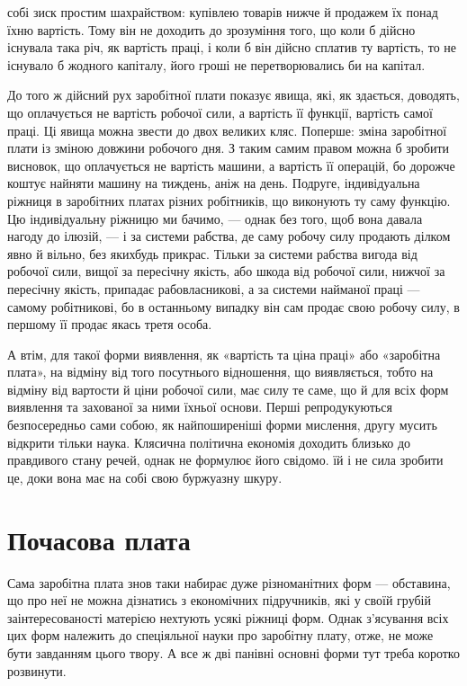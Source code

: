 \parcont{}  %
собі зиск простим шахрайством: купівлею товарів нижче й продажем
їх понад їхню вартість. Тому він не доходить до зрозуміння
того, що коли б дійсно існувала така річ, як вартість праці, і
коли б він дійсно сплатив ту вартість, то не існувало б жодного
капіталу, його гроші не перетворювались би на капітал.

До того ж дійсний рух заробітної плати показує явища, які,
як здається, доводять, що оплачується не вартість робочої
сили, а вартість її функції, вартість самої праці. Ці явища можна
звести до двох великих кляс. Поперше: зміна заробітної плати
із зміною довжини робочого дня. З таким самим правом можна б
зробити висновок, що оплачується не вартість машини, а вартість
її операцій, бо дорожче коштує найняти машину на тиждень,
аніж на день. Подруге, індивідуальна ріжниця в заробітних
платах різних робітників, що виконують ту саму функцію. Цю індивідуальну
ріжницю ми бачимо, — однак без того, щоб вона давала
нагоду до ілюзій, — і за системи рабства, де саму робочу силу
продають ділком явно й вільно, без якихбудь прикрас. Тільки за
системи рабства вигода від робочої сили, вищої за пересічну якість,
або шкода від робочої сили, нижчої за пересічну якість, припадає
рабовласникові, а за системи найманої праці — самому
робітникові, бо в останньому випадку він сам продає свою робочу
силу, в першому її продає якась третя особа.

А втім, для такої форми виявлення, як «вартість та ціна праці»
або «заробітна плата», на відміну від того посутнього відношення,
що виявляється, тобто на відміну від вартости й ціни робочої
сили, має силу те саме, що й для всіх форм виявлення та захованої
за ними їхньої основи. Перші репродукуються безпосередньо
сами собою, як найпоширеніші форми мислення, другу мусить
відкрити тільки наука. Клясична політична економія доходить
близько до правдивого стану речей, однак не формулює його
свідомо. їй і не сила зробити це, доки вона має на собі свою буржуазну
шкуру.

\section{Почасова плата}

Сама заробітна плата знов таки набирає дуже різноманітних
форм — обставина, що про неї не можна дізнатись з економічних
підручників, які у своїй грубій заінтересованості матерією нехтують
усякі ріжниці форм. Однак з’ясування всіх цих форм
належить до спеціяльної науки про заробітну плату, отже, не
може бути завданням цього твору. А все ж дві панівні основні
форми тут треба коротко розвинути.

